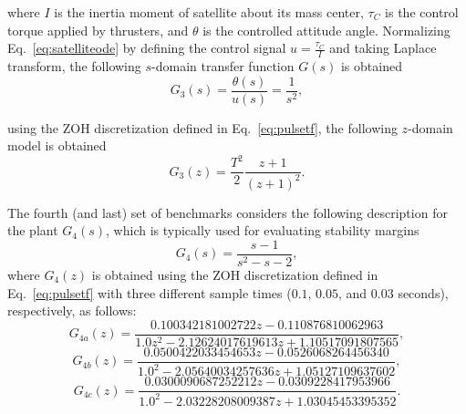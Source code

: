 \documentclass{sig-alternate-05-2015}
\begin{document}
\noindent where $I$ is the inertia moment of satellite about its mass
center, $\tau_{C}$ is the control torque applied by thrusters, and $\theta$
is the controlled attitude angle.  Normalizing Eq.~\eqref{eq:satelliteode}
by defining the control signal $u=\frac{\tau_{C}}{I}$ and taking Laplace
transform, the following $s$-domain transfer function $G(s)$ is obtained
%
\begin{equation}
\label{eq:satellitetf}
G_{3}(s)=\frac{\theta(s)}{u(s)}=\frac{1}{s^2},
\end{equation}

\noindent using the ZOH discretization defined in Eq.~\eqref{eq:pulsetf}, 
the following $z$-domain model is obtained
%
\begin{equation}
G_{3}(z)= \frac{T^{2}}{2} \frac{z+1}{(z+1)^{2}}. \nonumber
\end{equation}

%
%

The fourth (and last) set of benchmarks considers the following description
for the plant $G_{4}(s)$, which is typically used for evaluating stability
margins~\cite{bhattacharyya97, keel_Bhattacharyya_examples}
%
\begin{equation}
\label{exampleA}
G_{4}(s)=\frac{s-1}{s^{2}-s-2},
\end{equation}
%
\noindent where $G_{4}(z)$ is obtained using the ZOH discretization defined
in Eq.~\eqref{eq:pulsetf} with three different sample times ($0.1$, $0.05$,
and $0.03$ seconds), respectively, as follows:
%
\begin{equation}
\label{exampleA-sampletime1}
G_{4a}(z)=\frac{0.100342181002722z - 0.110876810062963}{1.0z^{2} - 2.12624017619613z + 1.10517091807565}, \nonumber
\end{equation}
%
%
\begin{equation}
\label{exampleA-sampletime2}
G_{4b}(z)=\frac{0.0500422033454653z - 0.0526068264456340}{1.0^{2} - 2.05640034257636z + 1.05127109637602}, \nonumber
\end{equation}
%
%
\begin{equation}
\label{exampleA-sampletime3}
G_{4c}(z)=\frac{0.0300090687252212z - 0.0309228417953966}{1.0^{2} - 2.03228208009387z + 1.03045453395352}. \nonumber
\end{equation}
\end{document}
